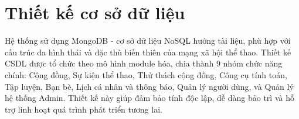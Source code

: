 
\section{Thiết kế cơ sở dữ liệu}
\label{sec:database_design}

Hệ thống sử dụng MongoDB - cơ sở dữ liệu NoSQL hướng tài liệu, phù hợp với cấu trúc đa hình thái và đặc thù biến thiên của mạng xã hội thể thao. Thiết kế CSDL được tổ chức theo mô hình module hóa, chia thành 9 nhóm chức năng chính: Cộng đồng, Sự kiện thể thao, Thử thách cộng đồng, Công cụ tính toán, Tập luyện, Bạn bè, Lịch cá nhân và thông báo, Quản lý người dùng, và Quản lý hệ thống Admin. Thiết kế này giúp đảm bảo tính độc lập, dễ dàng bảo trì và hỗ trợ linh hoạt quá trình phát triển tương lai.

